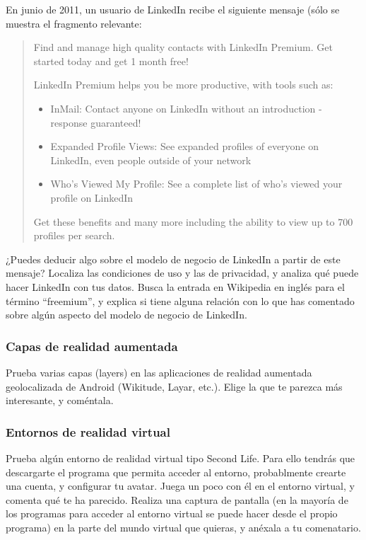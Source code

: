 \documentclass[a4paper,12pt]{article}
\begin{document}
En junio de 2011, un usuario de LinkedIn recibe el siguiente mensaje (sólo se muestra el fragmento relevante:

\begin{quotation}
Find and manage high quality contacts with LinkedIn Premium. Get started today and get 1 month free!

LinkedIn Premium helps you be more productive, with tools such as:

\begin{itemize}
\item InMail: Contact anyone on LinkedIn without an introduction - response guaranteed!
\item Expanded Profile Views: See expanded profiles of everyone on LinkedIn, even people outside of your network
\item Who's Viewed My Profile: See a complete list of who's viewed your profile on LinkedIn
\end{itemize}

Get these benefits and many more including the ability to view up to 700 profiles per search.
\end{quotation}

¿Puedes deducir algo sobre el modelo de negocio de LinkedIn a partir de este mensaje? Localiza las condiciones de uso y las de privacidad, y analiza qué puede hacer LinkedIn con tus datos. Busca la entrada en Wikipedia en inglés para el término ``freemium'', y explica si tiene alguna relación con lo que has comentado sobre algún aspecto del modelo de negocio de LinkedIn.

\subsubsection{Capas de realidad aumentada}
\label{sub:capas-realidad-aumentada}

Prueba varias capas (layers) en las aplicaciones de realidad aumentada geolocalizada de Android (Wikitude, Layar, etc.). Elige la que te parezca más interesante, y coméntala.

\subsubsection{Entornos de realidad virtual}
\label{sub:entornos-realidad-virtual}

Prueba algún entorno de realidad virtual tipo Second Life. Para ello tendrás que descargarte el programa que permita acceder al entorno, probablmente crearte una cuenta, y configurar tu avatar. Juega un poco con él en el entorno virtual, y comenta qué te ha parecido. Realiza una captura de pantalla (en la mayoría de los programas para acceder al entorno virtual se puede hacer desde el propio programa) en la parte del mundo virtual que quieras, y anéxala a tu comenatario.
\end{document}
